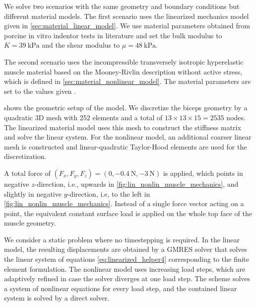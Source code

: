 We solve two scenarios with the same geometry and boundary conditions but different material models. The first scenario uses the linearized mechanics model given in \cref{sec:material_linear_model}. We use material parameters obtained from porcine in vitro indentor tests in literature \cite{schock1982vivo} and set the bulk modulus to $K=\SI{39}{\kilo\pascal}$ and the shear modulus to $\mu=\SI{48}{\kilo\pascal}$.

The second scenario uses the incompressible transversely isotropic hyperelastic muscle material based on the Mooney-Rivlin description without active stress, which is defined in \cref{sec:material_nonlinear_model}. The material parameters are set to the values given \cite{Heidlauf2016}.

 shows the geometric setup of the model. We discretize the biceps geometry by a quadratic 3D mesh with 252  elements and a total of $13 \times 13 \times 15 = 2535$ nodes.
The linearized material model uses this mesh to construct the stiffness matrix and solve the linear system.
For the nonlinear model, an additional coarser linear mesh is constructed and linear-quadratic Taylor-Hood elements are used for the discretization. 

A total force of $(F_x,F_y,F_z) = (0,\SI{-0.4}{\newton},\SI{-3}{\newton})$ is applied, which points in negative $z$-direction, i.e., upwards in \cref{fig:lin_nonlin_muscle_mechanics}, and slightly in negative $y$-direction, i.e, to the left in \cref{fig:lin_nonlin_muscle_mechanics}.
Instead of a single force vector acting on a point, the equivalent constant surface load is applied on the whole top face of the muscle geometry.

We consider a static problem where no timestepping is required. In the linear model, the resulting displacements are obtained by a GMRES solver that solves the linear system of equations \cref{eq:linearized_helper4} corresponding  to the finite element formulation.
The nonlinear model uses increasing load steps, which are adaptively refined in case the solver diverges at one load step. The scheme solves a system of nonlinear equations for every load step, and the contained linear system is solved by a direct solver.

